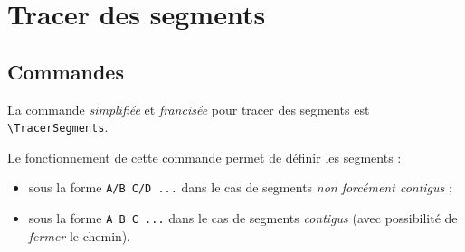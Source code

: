 \documentclass[french,a4paper,11pt]{article}
\begin{document}
\begin{DemoCode}[]
\end{DemoCode}

\begin{DemoCode}[]
\end{DemoCode}

\pagebreak

\section{Tracer des segments}

\subsection{Commandes}

\begin{cautionblock}
La commande \textit{simplifiée} et \textit{francisée} pour tracer des segments est \texttt{\textbackslash TracerSegments}.

\smallskip

Le fonctionnement de cette commande permet de définir les segments :

\begin{itemize}
	\item sous la forme \texttt{A/B C/D ...} dans le cas de segments \textit{non forcément contigus} ;
	\item sous la forme \texttt{A B C ...} dans le cas de segments \textit{contigus} (avec possibilité de \textit{fermer} le chemin).
\end{itemize}
\end{cautionblock}

\begin{DemoCode}

\end{DemoCode}
\end{document}
